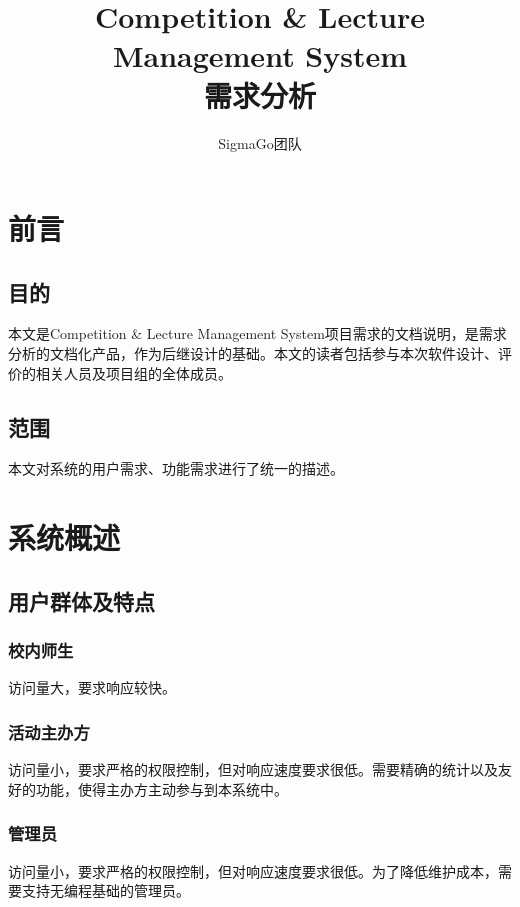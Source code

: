 \documentclass[a4paper,12pt]{article}
\title{Competition \& Lecture Management System\\需求分析}
\author{SigmaGo团队}
\begin{document}
    \maketitle
    \section{前言} %
    \label{sec:前言}
    \subsection{目的} %
    \label{sub:目的}
    本文是Competition \& Lecture Management System项目需求的文档说明，是需求分析的文档化产品，作为后继设计的基础。本文的读者包括参与本次软件设计、评价的相关人员及项目组的全体成员。
    \subsection{范围} %
    \label{sub:范围}
    本文对系统的用户需求、功能需求进行了统一的描述。
    \section{系统概述} %
    \label{sec:系统概述}
    \subsection{用户群体及特点} %
    \label{sub:用户群体及特点}
    \subsubsection{校内师生} %
    \label{ssub:校内师生}
    访问量大，要求响应较快。
    \subsubsection{活动主办方} %
    \label{ssub:活动主办方}
    访问量小，要求严格的权限控制，但对响应速度要求很低。需要精确的统计以及友好的功能，使得主办方主动参与到本系统中。
    \subsubsection{管理员} %
    \label{ssub:管理员}
    访问量小，要求严格的权限控制，但对响应速度要求很低。为了降低维护成本，需要支持无编程基础的管理员。
\end{document}
